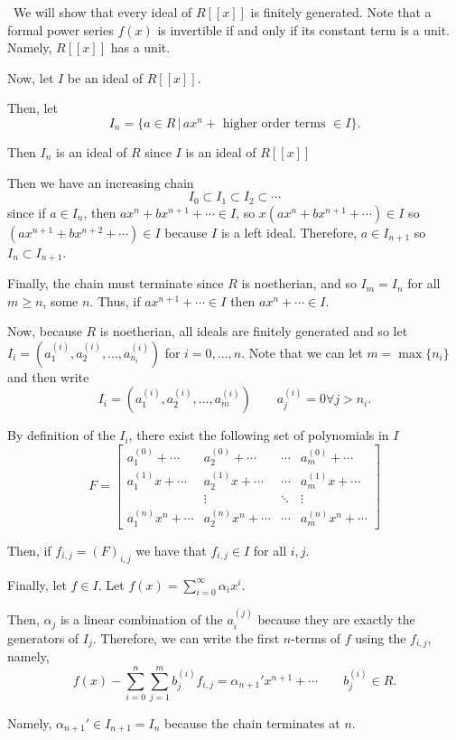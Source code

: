 \documentclass[12pt]{AlgebraQual}
\begin{document}
\begin{solution}$\,$
We will show that every ideal of $R[[x]]$ is finitely generated. Note that a formal power series $f(x)$ is invertible if and only if its constant term is a unit. Namely, $R[[x]]$ has a unit.

Now, let $I$ be an ideal of $R[[x]].$

Then, let $$I_n=\{a\in R\,|\, ax^n+\text{ higher order terms }\in I\}.$$

Then $I_n$ is an ideal of $R$ since $I$ is an ideal of $R[[x]]$

Then we have an increasing chain  $$I_0\subset I_1\subset I_2\subset\cdots$$ since if $a\in I_n$, then $ax^n+bx^{n+1}+\cdots\in I$, so $x(ax^n+bx^{n+1}+\cdots)\in I$ so $(ax^{n+1}+bx^{n+2}+\cdots)\in I$ because $I$ is a left ideal. Therefore, $a\in I_{n+1}$ so $I_n\subset I_{n+1}$.

Finally, the chain must terminate since $R$ is noetherian, and so $I_m=I_n$ for all $m\ge n$, some $n.$ Thus, if $ax^{n+1}+\cdots\in I$ then $ax^n+\cdots\in I$.

Now, because $R$ is noetherian, all ideals are finitely generated and so let $I_i=(a_1^{(i)},a_2^{(i)},...,a_{n_i}^{(i)})$ for $i=0,...,n$. Note that we can let $m=\max\{n_i\}$ and then write $$I_i=(a_1^{(i)},a_2^{(i)},...,a_m^{(i)})\qquad a_j^{(i)}=0\forall j>n_i.$$

By definition of the $I_i$, there exist the following set of polynomials in $I$ $$F=\begin{bmatrix}
a_1^{(0)}+\cdots & a_2^{(0)}+\cdots &\cdots & a_m^{(0)}+\cdots\\
a_1^{(1)}x+\cdots & a_2^{(1)}x+\cdots &\cdots & a_m^{(1)}x+\cdots\\
& \vdots & \ddots & \vdots\\
a_1^{(n)}x^n+\cdots & a_2^{(n)}x^n+\cdots &\cdots & a_m^{(n)}x^n+\cdots
\end{bmatrix}$$

Then, if $f_{i,j}=(F)_{i,j}$ we have that $f_{i,j}\in I$ for all $i,j$.

Finally, let $f\in I$. Let $\displaystyle f(x)=\sum_{i=0}^\infty\alpha_ix^i$.

Then, $\alpha_j$ is a linear combination of the $a_i^{(j)}$ because they are exactly the generators of $I_j$. Therefore, we can write the first $n$-terms of $f$ using the $f_{i,j}$, namely, $$f(x)-\sum_{i=0}^n\sum_{j=1}^mb_j^{(i)}f_{i,j}=\alpha_{n+1}'x^{n+1}+\cdots\qquad b_j^{(i)}\in R.$$

Namely, $\alpha_{n+1}'\in I_{n+1}=I_n$ because the chain terminates at $n$.


\end{solution}
\end{document}
